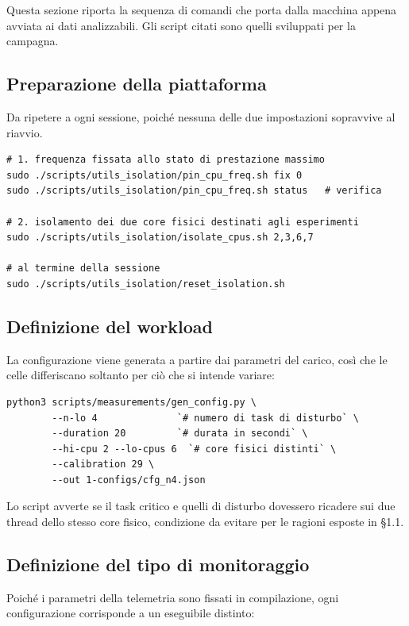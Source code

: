 Questa sezione riporta la sequenza di comandi che porta dalla macchina appena avviata ai dati
analizzabili. Gli script citati sono quelli sviluppati per la campagna.

\subsection{Preparazione della piattaforma}

Da ripetere a ogni sessione, poich\'e nessuna delle due impostazioni sopravvive al riavvio.

\begin{lstlisting}
# 1. frequenza fissata allo stato di prestazione massimo
sudo ./scripts/utils_isolation/pin_cpu_freq.sh fix 0
sudo ./scripts/utils_isolation/pin_cpu_freq.sh status   # verifica

# 2. isolamento dei due core fisici destinati agli esperimenti
sudo ./scripts/utils_isolation/isolate_cpus.sh 2,3,6,7

# al termine della sessione
sudo ./scripts/utils_isolation/reset_isolation.sh
\end{lstlisting}

\subsection{Definizione del workload}

La configurazione viene generata a partire dai parametri del carico, cos\`i che le celle differiscano
soltanto per ci\`o che si intende variare:

\begin{lstlisting}
python3 scripts/measurements/gen_config.py \
        --n-lo 4              `# numero di task di disturbo` \
        --duration 20         `# durata in secondi` \
        --hi-cpu 2 --lo-cpus 6  `# core fisici distinti` \
        --calibration 29 \
        --out 1-configs/cfg_n4.json
\end{lstlisting}

Lo script avverte se il task critico e quelli di disturbo dovessero ricadere sui due thread dello
stesso core fisico, condizione da evitare per le ragioni esposte in \S1.1.

\subsection{Definizione del tipo di monitoraggio}

Poich\'e i parametri della telemetria sono fissati in compilazione, ogni configurazione corrisponde
a un eseguibile distinto:

